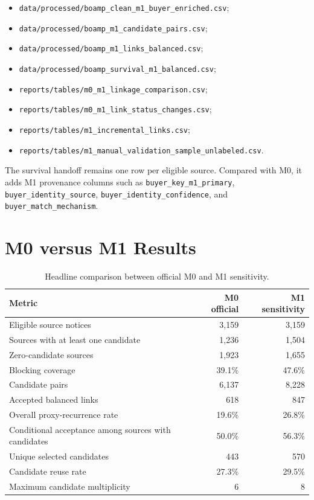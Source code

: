\documentclass[11pt]{article}
\begin{document}
\begin{itemize}
  \item \texttt{data/processed/boamp\_clean\_m1\_buyer\_enriched.csv};
  \item \texttt{data/processed/boamp\_m1\_candidate\_pairs.csv};
  \item \texttt{data/processed/boamp\_m1\_links\_balanced.csv};
  \item \texttt{data/processed/boamp\_survival\_m1\_balanced.csv};
  \item \texttt{reports/tables/m0\_m1\_linkage\_comparison.csv};
  \item \texttt{reports/tables/m0\_m1\_link\_status\_changes.csv};
  \item \texttt{reports/tables/m1\_incremental\_links.csv};
  \item \texttt{reports/tables/m1\_manual\_validation\_sample\_unlabeled.csv}.
\end{itemize}

The survival handoff remains one row per eligible source. Compared with
M0, it adds M1 provenance columns such as
\texttt{buyer\_key\_m1\_primary}, \texttt{buyer\_identity\_source},
\texttt{buyer\_identity\_confidence}, and
\texttt{buyer\_match\_mechanism}.

\section{M0 versus M1 Results}
\label{sec:results}

\begin{table}[h]
\centering
\caption{Headline comparison between official M0 and M1 sensitivity.}
\begin{tabular}{lrr}
\toprule
Metric & M0 official & M1 sensitivity\\
\midrule
Eligible source notices & 3,159 & 3,159\\
Sources with at least one candidate & 1,236 & 1,504\\
Zero-candidate sources & 1,923 & 1,655\\
Blocking coverage & 39.1\% & 47.6\%\\
Candidate pairs & 6,137 & 8,228\\
Accepted balanced links & 618 & 847\\
Overall proxy-recurrence rate & 19.6\% & 26.8\%\\
Conditional acceptance among sources with candidates & 50.0\% & 56.3\%\\
Unique selected candidates & 443 & 570\\
Candidate reuse rate & 27.3\% & 29.5\%\\
Maximum candidate multiplicity & 6 & 8\\
\bottomrule
\end{tabular}
\end{table}
\end{document}
